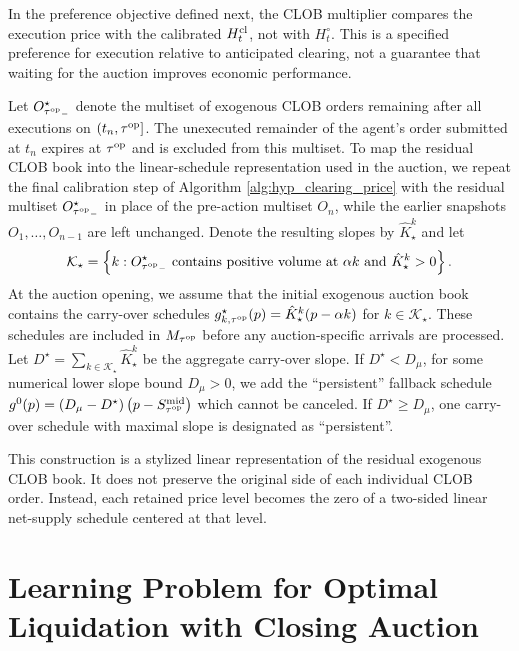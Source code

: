 \documentclass[11pt]{article}
\begin{document}
In the preference objective defined next, the CLOB multiplier compares the execution price with the calibrated $H_t^{\mathrm{cl}}$, not with $H_t^\circ$. This is a specified preference for execution relative to anticipated clearing, not a guarantee that waiting for the auction improves economic performance.\vspace{0.5em}
\endgroup

Let $O_{{\tau^{\mathrm{op}}}_-}^{\star}$ denote the multiset of exogenous CLOB orders remaining after all executions on $(t_n,\tau^{\mathrm{op}}]$. The unexecuted remainder of the agent's order submitted at $t_n$ expires at $\tau^{\mathrm{op}}$ and is excluded from this multiset. To map the residual CLOB book into the linear-schedule representation
used in the auction, we repeat the final calibration step of
Algorithm \ref{alg:hyp_clearing_price} with the residual multiset
$O_{{\tau^{\mathrm{op}}}_-}^{\star}$ in place of the pre-action multiset $O_n$, while the earlier snapshots $O_1,\ldots,O_{n-1}$ are left unchanged. Denote the resulting slopes by
$\hat K_{\star}^k$ and let
\[\mathcal K_{\star} = \left\{ k: O_{{\tau^{\mathrm{op}}}_-}^{\star} \text{ contains positive volume at $\alpha k$ and $\hat K_{\star}^k>0$}\right\}. \]
At the auction opening, we assume that the initial exogenous auction book contains
the carry-over schedules $g_{k,\tau^{\mathrm{op}}}^{\star}(p) = \hat K_{\star}^k(p-\alpha k)$ for $k\in\mathcal K_{\star}$. These schedules are included in $M_{\tau^{\mathrm{op}}}$ before any auction-specific arrivals are processed. Let $D^\star=\sum_{k\in\mathcal K_\star}\hat K_\star^k$ be the aggregate carry-over slope. If
$D^\star<D_\mu$, for some numerical lower slope bound $D_\mu >0$, we add the ``persistent'' fallback schedule $g^0(p) = (D_\mu-D^\star) \left(p-S_{\tau^{\mathrm{op}}}^{\mathrm{mid}}\right)$ which cannot be canceled. If
$D^\star\geqslant D_\mu$, one carry-over schedule with maximal
slope is designated as ``persistent''.

\begin{remark}
    This construction is a stylized linear representation of the residual exogenous CLOB book. It does not preserve the original side of each individual CLOB order. Instead, each retained price level becomes the zero of a two-sided linear net-supply schedule centered at that level.
\end{remark}

\section{Learning Problem for Optimal Liquidation with Closing Auction}\label{sec:MDP}
\end{document}
